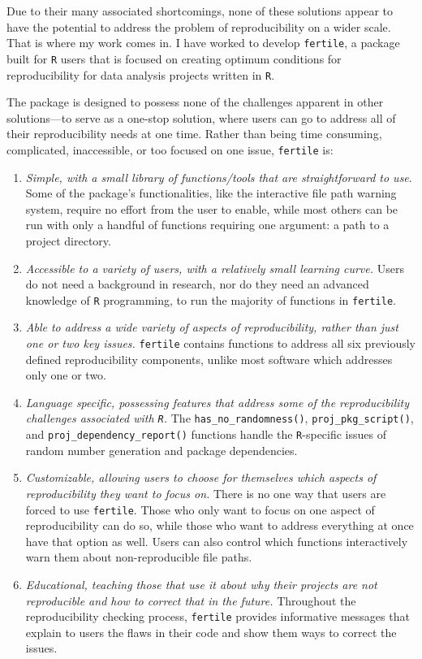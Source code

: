 \documentclass[12pt,twoside]{reedthesis}
\begin{document}
Due to their many associated shortcomings, none of these solutions appear to have the potential to address the problem of reproducibility on a wider scale. That is where my work comes in. I have worked to develop \texttt{fertile}, a package built for \texttt{R} users that is focused on creating optimum conditions for reproducibility for data analysis projects written in \texttt{R}.

The package is designed to possess none of the challenges apparent in other solutions---to serve as a one-stop solution, where users can go to address all of their reproducibility needs at one time. Rather than being time consuming, complicated, inaccessible, or too focused on one issue, \texttt{fertile} is:
\begin{enumerate}
\def\labelenumi{\arabic{enumi})}
\item
  \emph{Simple, with a small library of functions/tools that are straightforward to use}. Some of the package's functionalities, like the interactive file path warning system, require no effort from the user to enable, while most others can be run with only a handful of functions requiring one argument: a path to a project directory.
\item
  \emph{Accessible to a variety of users, with a relatively small learning curve.} Users do not need a background in research, nor do they need an advanced knowledge of \texttt{R} programming, to run the majority of functions in \texttt{fertile}.
\item
  \emph{Able to address a wide variety of aspects of reproducibility, rather than just one or two key issues.} \texttt{fertile} contains functions to address all six previously defined reproducibility components, unlike most software which addresses only one or two.
\item
  \emph{Language specific, possessing features that address some of the reproducibility challenges associated with \texttt{R}.} The \texttt{has\_no\_randomness()}, \texttt{proj\_pkg\_script()}, and \texttt{proj\_dependency\_report()} functions handle the \texttt{R}-specific issues of random number generation and package dependencies.
\item
  \emph{Customizable, allowing users to choose for themselves which aspects of reproducibility they want to focus on.} There is no one way that users are forced to use \texttt{fertile}. Those who only want to focus on one aspect of reproducibility can do so, while those who want to address everything at once have that option as well. Users can also control which functions interactively warn them about non-reproducible file paths.
\item
  \emph{Educational, teaching those that use it about why their projects are not reproducible and how to correct that in the future.} Throughout the reproducibility checking process, \texttt{fertile} provides informative messages that explain to users the flaws in their code and show them ways to correct the issues.
\end{enumerate}
\end{document}
